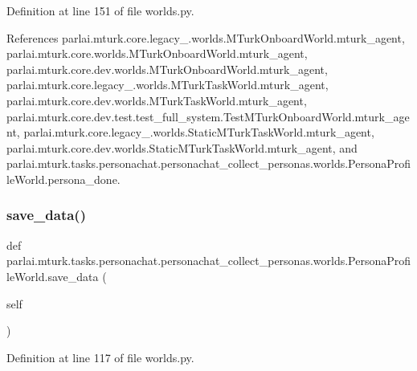 Definition at line 151 of file worlds.\+py.



References parlai.\+mturk.\+core.\+legacy\+\_.\+worlds.\+M\+Turk\+Onboard\+World.\+mturk\+\_\+agent, parlai.\+mturk.\+core.\+worlds.\+M\+Turk\+Onboard\+World.\+mturk\+\_\+agent, parlai.\+mturk.\+core.\+dev.\+worlds.\+M\+Turk\+Onboard\+World.\+mturk\+\_\+agent, parlai.\+mturk.\+core.\+legacy\+\_.\+worlds.\+M\+Turk\+Task\+World.\+mturk\+\_\+agent, parlai.\+mturk.\+core.\+dev.\+worlds.\+M\+Turk\+Task\+World.\+mturk\+\_\+agent, parlai.\+mturk.\+core.\+dev.\+test.\+test\+\_\+full\+\_\+system.\+Test\+M\+Turk\+Onboard\+World.\+mturk\+\_\+agent, parlai.\+mturk.\+core.\+legacy\+\_.\+worlds.\+Static\+M\+Turk\+Task\+World.\+mturk\+\_\+agent, parlai.\+mturk.\+core.\+dev.\+worlds.\+Static\+M\+Turk\+Task\+World.\+mturk\+\_\+agent, and parlai.\+mturk.\+tasks.\+personachat.\+personachat\+\_\+collect\+\_\+personas.\+worlds.\+Persona\+Profile\+World.\+persona\+\_\+done.

\mbox{\label{classparlai_1_1mturk_1_1tasks_1_1personachat_1_1personachat__collect__personas_1_1worlds_1_1PersonaProfileWorld_afb7beff8437dadf18a1e39d16f21eec8}} 
\subsubsection{\texorpdfstring{save\+\_\+data()}{save\_data()}}
{\footnotesize\ttfamily def parlai.\+mturk.\+tasks.\+personachat.\+personachat\+\_\+collect\+\_\+personas.\+worlds.\+Persona\+Profile\+World.\+save\+\_\+data (\begin{DoxyParamCaption}\item[{}]{self }\end{DoxyParamCaption})}



Definition at line 117 of file worlds.\+py.



